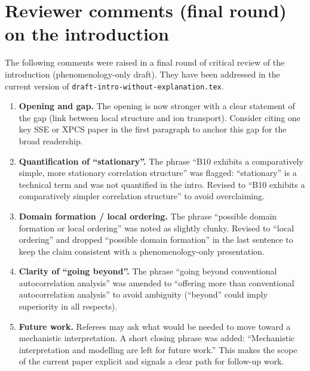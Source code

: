 
\section*{Reviewer comments (final round) on the introduction}

The following comments were raised in a final round of critical review of the introduction (phenomenology-only draft). They have been addressed in the current version of \texttt{draft-intro-without-explanation.tex}.

\begin{enumerate}
\item \textbf{Opening and gap.} The opening is now stronger with a clear statement of the gap (link between local structure and ion transport). Consider citing one key SSE or XPCS paper in the first paragraph to anchor this gap for the broad readership.

\item \textbf{Quantification of ``stationary''.} The phrase ``B10 exhibits a comparatively simple, more stationary correlation structure'' was flagged: ``stationary'' is a technical term and was not quantified in the intro. Revised to ``B10 exhibits a comparatively simpler correlation structure'' to avoid overclaiming.

\item \textbf{Domain formation / local ordering.} The phrase ``possible domain formation or local ordering'' was noted as slightly clunky. Revised to ``local ordering'' and dropped ``possible domain formation'' in the last sentence to keep the claim consistent with a phenomenology-only presentation.

\item \textbf{Clarity of ``going beyond''.} The phrase ``going beyond conventional autocorrelation analysis'' was amended to ``offering more than conventional autocorrelation analysis'' to avoid ambiguity (``beyond'' could imply superiority in all respects).

\item \textbf{Future work.} Referees may ask what would be needed to move toward a mechanistic interpretation. A short closing phrase was added: ``Mechanistic interpretation and modelling are left for future work.'' This makes the scope of the current paper explicit and signals a clear path for follow-up work.
\end{enumerate}

